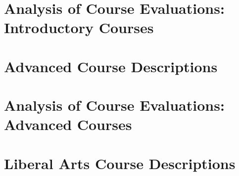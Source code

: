 \documentclass[../../main.tex]{subfiles}
\begin{document}
\section{Analysis of Course Evaluations: Introductory Courses}

%

\begin{flushleft}

\end{flushleft}

\section{Advanced Course Descriptions}

%

\begin{flushleft}

\end{flushleft}

\section{Analysis of Course Evaluations: Advanced Courses}

%

\begin{flushleft}

\end{flushleft}

\section{Liberal Arts Course Descriptions}

%

\begin{flushleft}

\end{flushleft}
\end{document}

